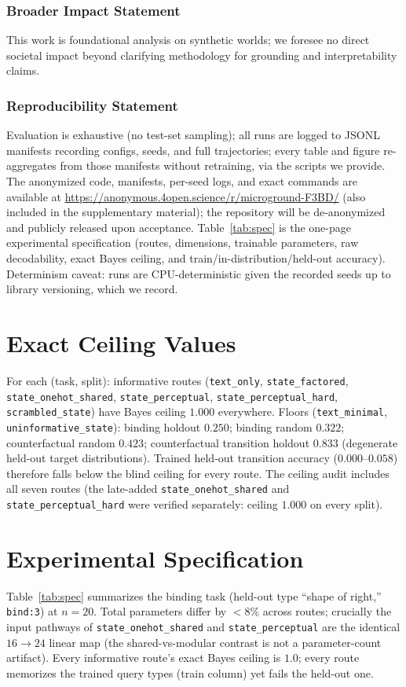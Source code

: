 \documentclass[10pt]{article} %
\begin{document}
\subsubsection*{Broader Impact Statement}
This work is foundational analysis on synthetic worlds; we foresee no direct societal impact
beyond clarifying methodology for grounding and interpretability claims.

\subsubsection*{Reproducibility Statement}
Evaluation is exhaustive (no test-set sampling); all runs are logged to JSONL manifests recording
configs, seeds, and full trajectories; every table and figure re-aggregates from those manifests
without retraining, via the scripts we provide. The anonymized code, manifests, per-seed logs, and
exact commands are available at \url{https://anonymous.4open.science/r/microground-F3BD/} (also
included in the supplementary material); the repository will be de-anonymized and publicly released
upon acceptance. Table~\ref{tab:spec} is the one-page experimental specification (routes, dimensions,
trainable parameters, raw decodability, exact Bayes ceiling, and train/in-distribution/held-out
accuracy). Determinism caveat: runs are CPU-deterministic given the recorded seeds up to library
versioning, which we record.




\appendix
\section{Exact Ceiling Values}
\label{app:ceilings}
For each (task, split): informative routes (\texttt{text\_only}, \texttt{state\_factored},
\texttt{state\_onehot\_shared}, \texttt{state\_perceptual}, \texttt{state\_perceptual\_hard},
\texttt{scrambled\_state}) have Bayes ceiling $1.000$ everywhere. Floors
(\texttt{text\_minimal}, \texttt{uninformative\_state}): binding holdout $0.250$; binding random
$0.322$; counterfactual random $0.423$; counterfactual transition holdout $0.833$ (degenerate
held-out target distributions). Trained held-out transition accuracy ($0.000$--$0.058$) therefore
falls below the blind ceiling for every route. The ceiling audit includes all seven routes
(the late-added \texttt{state\_onehot\_shared} and \texttt{state\_perceptual\_hard} were verified
separately: ceiling $1.000$ on every split).

\section{Experimental Specification}
\label{app:spec}
Table~\ref{tab:spec} summarizes the binding task (held-out type ``shape of right,''
\texttt{bind:3}) at $n{=}20$. Total parameters differ by $<8\%$ across routes; crucially the input
pathways of \texttt{state\_onehot\_shared} and \texttt{state\_perceptual} are the identical
$16{\to}24$ linear map (the shared-vs-modular contrast is not a parameter-count artifact). Every
informative route's exact Bayes ceiling is $1.0$; every route memorizes the trained query types
(train column) yet fails the held-out one.
\end{document}
